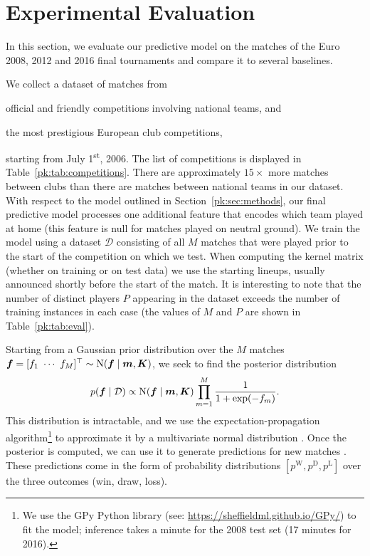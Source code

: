 \section{Experimental Evaluation}
\label{pk:sec:evaluation}

In this section, we evaluate our predictive model on the matches of the Euro 2008, 2012 and 2016 final tournaments and compare it to several baselines.

We collect a dataset of matches from
\begin{enuminline}
\item official and friendly competitions involving national teams, and
\item the most prestigious European club competitions,
\end{enuminline}
starting from July 1\textsuperscript{st}, 2006.
The list of competitions is displayed in Table~\ref{pk:tab:competitions}.
There are approximately $15 \times$ more matches between clubs than there are matches between national teams in our dataset.
With respect to the model outlined in Section~\ref{pk:sec:methods}, our final predictive model processes one additional feature that encodes which team played at home (this feature is null for matches played on neutral ground).
We train the model using a dataset $\mathcal{D}$ consisting of all $M$ matches that were played prior to the start of the competition on which we test.
When computing the kernel matrix (whether on training or on test data) we use the starting lineups, usually announced shortly before the start of the match.
It is interesting to note that the number of distinct players $P$ appearing in the dataset exceeds the number of training instances in each case (the values of $M$ and $P$ are shown in Table~\ref{pk:tab:eval}).

Starting from a Gaussian prior distribution over the $M$ matches $\bm{f} = [f_1 \ \cdots \ f_M]^\top \sim \mathrm{N}( \bm{f} \mid \bm{m}, \bm{K} )$, we seek to find the posterior distribution
\begin{align*}
p(\bm{f} \mid \mathcal{D}) \propto \mathrm{N}( \bm{f} \mid \bm{m}, \bm{K} ) \prod_{m = 1}^M \frac{1}{1 + \exp(- f_m)}.
\end{align*}
This distribution is intractable, and we use the expectation-propagation algorithm\footnote{%
We use the GPy Python library (see: \url{https://sheffieldml.github.io/GPy/}) to fit the model; inference takes a minute for the 2008 test set (17 minutes for 2016).}
to approximate it by a multivariate normal distribution \citep{minka2001family}.
Once the posterior is computed, we can use it to generate predictions for new matches \citep{rasmussen2006gaussian}.
These predictions come in the form of probability distributions $[p^{\text{W}}, p^{\text{D}}, p^{\text{L}}]$ over the three outcomes (win, draw, loss).

